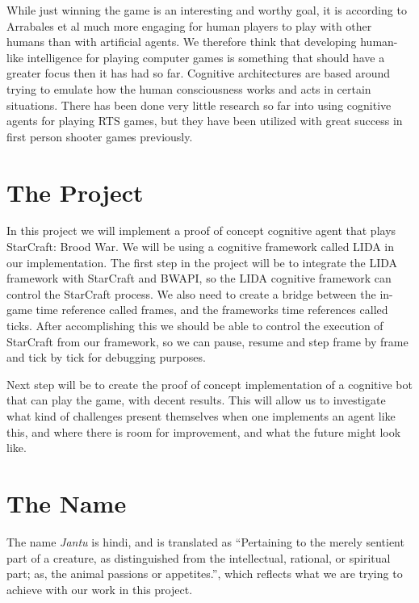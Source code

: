 While just winning the game is an interesting and worthy goal, it is according to Arrabales et al much more engaging for human players to play with other humans than with artificial agents.\cite{arrabales2009gamechars} We therefore think that developing human-like intelligence for playing computer games is something that should have a greater focus then it has had so far. Cognitive architectures are based around trying to emulate how the human consciousness works and acts in certain situations. There has been done very little research so far into using cognitive agents for playing RTS games, but they have been utilized with great success in first person shooter games previously.\cite{arrabales2009gamechars}

\section{The Project}
In this project we will implement a proof of concept cognitive agent that plays StarCraft: Brood War. We will be using a cognitive framework called LIDA in our implementation. The first step in the project will be to integrate the LIDA framework with StarCraft and BWAPI, so the LIDA cognitive framework can control the StarCraft process. We also need to create a bridge between the in-game time reference called frames, and the frameworks time references called ticks. After accomplishing this we should be able to control the execution of StarCraft from our framework, so we can pause, resume and step frame by frame and tick by tick for debugging purposes.

Next step will be to create the proof of concept implementation of a cognitive bot that can play the game, with decent results. This will allow us to investigate what kind of challenges present themselves when one implements an agent like this, and where there is room for improvement, and what the future might look like.

\section{The Name}
\label{sec:name}
The name {\em Jantu} is hindi, and is translated as ``Pertaining to the merely sentient part of a creature, as distinguished from the intellectual, rational, or spiritual part; as, the animal passions or appetites.''\cite{hindijantu}, which reflects what we are trying to achieve with our work in this project.

